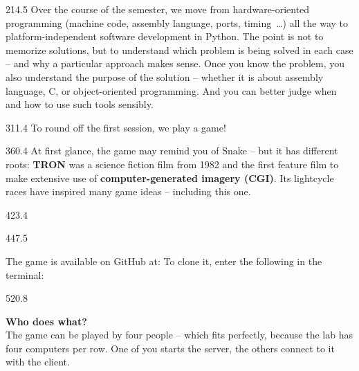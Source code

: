 \documentclass{aslab}
\begin{document}
\begin{region}{214.5}
Over the course of the semester, we move from hardware-oriented programming
(machine code, assembly language, ports, timing~\dots) all the way to
platform-independent software development in Python. The point is not to
memorize solutions, but to understand which problem is being solved in each
case -- and why a particular approach makes sense. Once you know the
problem, you also understand the purpose of the solution -- whether it is
about assembly language, C, or object-oriented programming. And you can
better judge when and how to use such tools sensibly.
\end{region}

\begin{region}{311.4}
\blank
To round off the first session, we play a game!
\end{region}

\begin{region}[pitch=13]{360.4}
At first glance, the game may remind you of Snake -- but it has different
roots: \textbf{TRON} was a science fiction film from 1982 and the first
feature film to make extensive use of \textbf{computer-generated imagery
(CGI)}. Its lightcycle races have inspired many game ideas -- including
this one.
\end{region}

\begin{region}{423.4}
\end{region}

\begin{region}{447.5}
\begin{tasks}
\item The game is available on GitHub at:
  \blank
  To clone it, enter the following in the terminal:
  \blank
\end{tasks}
\end{region}

\begin{region}{520.8}
\begin{tasks}[start=2]
\item \textbf{Who does what?}\\
  The game can be played by four people -- which fits perfectly, because
  the lab has four computers per row. One of you starts the server, the
  others connect to it with the client.
\end{tasks}
\end{region}
\end{document}
